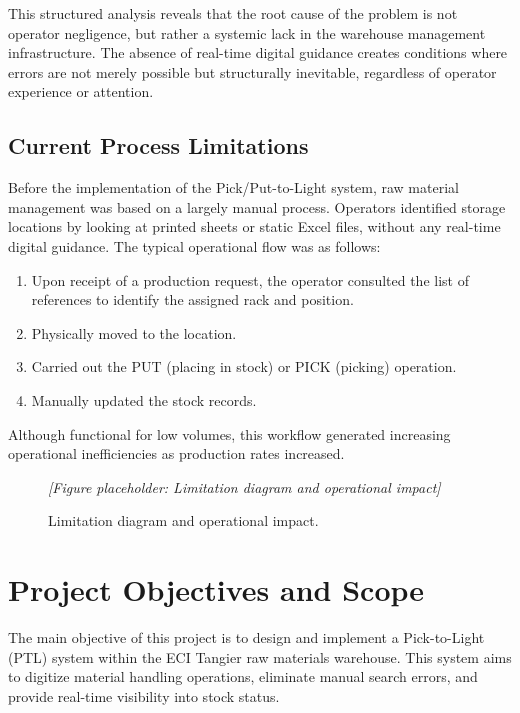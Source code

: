 This structured analysis reveals that the root cause of the problem is not operator negligence, but rather a systemic lack in the warehouse management infrastructure. The absence of real-time digital guidance creates conditions where errors are not merely possible but structurally inevitable, regardless of operator experience or attention.

\subsection{Current Process Limitations}

Before the implementation of the Pick/Put-to-Light system, raw material management was based on a largely manual process. Operators identified storage locations by looking at printed sheets or static Excel files, without any real-time digital guidance. The typical operational flow was as follows:

\begin{enumerate}
  \item Upon receipt of a production request, the operator consulted the list of references to identify the assigned rack and position.
  \item Physically moved to the location.
  \item Carried out the PUT (placing in stock) or PICK (picking) operation.
  \item Manually updated the stock records.
\end{enumerate}

Although functional for low volumes, this workflow generated increasing operational inefficiencies as production rates increased.

\begin{figure}[H]
  \centering
  \textit{[Figure placeholder: Limitation diagram and operational impact]}
  \caption{Limitation diagram and operational impact.}
  \label{fig:limitations}
\end{figure}

\section{Project Objectives and Scope}
\label{sec:objectives}

The main objective of this project is to design and implement a Pick-to-Light (PTL) system within the ECI Tangier raw materials warehouse. This system aims to digitize material handling operations, eliminate manual search errors, and provide real-time visibility into stock status.

